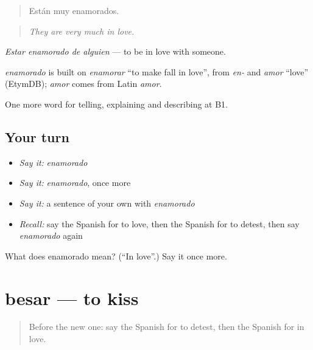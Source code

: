 \begin{quote}
Están muy enamorados.
\end{quote}

\begin{quote}
\emph{They are very much in love.}
\end{quote}

\emph{Estar enamorado de alguien} — to be in love with someone.

\begin{cousinweb}
\emph{enamorado} is built on \emph{enamorar} \textquotedblleft{}to make fall in love\textquotedblright{}, from \emph{en-} and \emph{amor} \textquotedblleft{}love\textquotedblright{} (EtymDB); \emph{amor} comes from Latin \emph{amor}.
\end{cousinweb}

\begin{grammarlens}[title={What you've built}]
One more word for telling, explaining and describing at B1.
\end{grammarlens}

\subsection*{Your turn}
\begin{itemize}
\raggedright
  \item \emph{Say it:} \emph{enamorado}
  \item \emph{Say it:} \emph{enamorado}, once more
  \item \emph{Say it:} a sentence of your own with \emph{enamorado}
  \item \emph{Recall:} say the Spanish for to love, then the Spanish for to detest, then say \emph{enamorado} again
\end{itemize}

\begin{tcolorbox}[breakable,colback=teal!4,colframe=teal!35!black,title={Before you move on}]
What does enamorado mean? (\textquotedblleft{}In love\textquotedblright{}.) Say it once more.
\end{tcolorbox}
\section[besar]{besar — to kiss}

\label{lesson:ES-C715-besar}



\begin{quote}
Before the new one: say the Spanish for to detest, then the Spanish for in love.
\end{quote}

